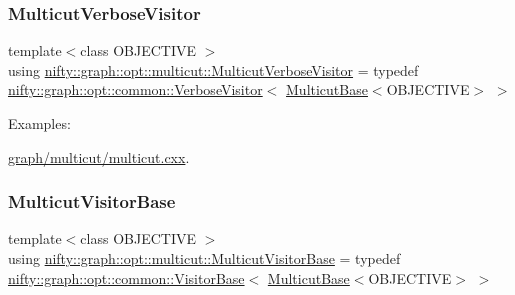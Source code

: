 \subsubsection{\texorpdfstring{Multicut\+Verbose\+Visitor}{MulticutVerboseVisitor}}
{\footnotesize\ttfamily template$<$class O\+B\+J\+E\+C\+T\+I\+VE $>$ \\
using \hyperlink{namespacenifty_1_1graph_1_1opt_1_1multicut_af26230604a77c9e38690db74e4fcb7b3}{nifty\+::graph\+::opt\+::multicut\+::\+Multicut\+Verbose\+Visitor} = typedef \hyperlink{classnifty_1_1graph_1_1opt_1_1common_1_1VerboseVisitor}{nifty\+::graph\+::opt\+::common\+::\+Verbose\+Visitor}$<$ \hyperlink{classnifty_1_1graph_1_1opt_1_1multicut_1_1MulticutBase}{Multicut\+Base}$<$O\+B\+J\+E\+C\+T\+I\+VE$>$ $>$}

\begin{Desc}
\item[Examples\+: ]\par
\hyperlink{graph_2multicut_2multicut_8cxx-example}{graph/multicut/multicut.\+cxx}.\end{Desc}
\mbox{\label{namespacenifty_1_1graph_1_1opt_1_1multicut_a3a8f68d7814a77531781fb55327f05d2}} 
\subsubsection{\texorpdfstring{Multicut\+Visitor\+Base}{MulticutVisitorBase}}
{\footnotesize\ttfamily template$<$class O\+B\+J\+E\+C\+T\+I\+VE $>$ \\
using \hyperlink{namespacenifty_1_1graph_1_1opt_1_1multicut_a3a8f68d7814a77531781fb55327f05d2}{nifty\+::graph\+::opt\+::multicut\+::\+Multicut\+Visitor\+Base} = typedef \hyperlink{classnifty_1_1graph_1_1opt_1_1common_1_1VisitorBase}{nifty\+::graph\+::opt\+::common\+::\+Visitor\+Base}$<$ \hyperlink{classnifty_1_1graph_1_1opt_1_1multicut_1_1MulticutBase}{Multicut\+Base}$<$O\+B\+J\+E\+C\+T\+I\+VE$>$ $>$}

\mbox{\label{namespacenifty_1_1graph_1_1opt_1_1multicut_aa3ab4d745c71c8cd9ea1535b73f6e54b}} 
